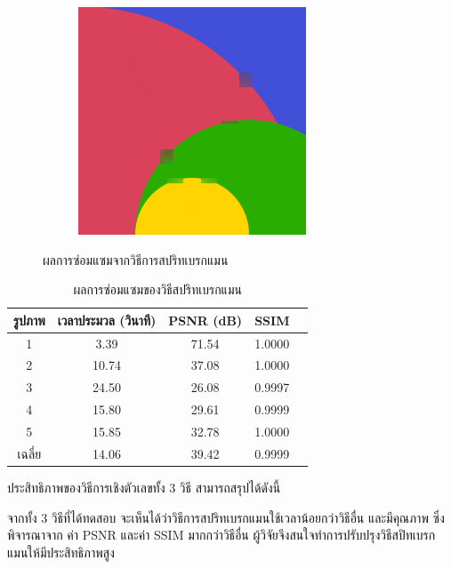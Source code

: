 \begin{figure}[H]
\begin{subfigure}{0.4\linewidth}
		\includegraphics[width=0.8\linewidth]{image/result_ex1/splitbergman05.png}			
	\end{subfigure}
	\caption{ผลการซ่อมแซมจากวิธีการสปริทเบรกแมน}
		\label{result:image-splitbregman}
\end{figure}
\begin{table}[H]
	\centering
	\begin{tabular}[ht]{|c|c|c|c|c|}
		\hline
		รูปภาพ &เวลาประมวล  (วินาที) & PSNR (dB) & SSIM \\
		\hline
		1 & 3.39 & 71.54 & 1.0000 \\ 
		2 & 10.74 & 37.08 & 1.0000 \\
		3 &  24.50 & 26.08 & 0.9997 \\
		4 & 15.80  & 29.61  & 0.9999 \\
		5 & 15.85  & 32.78  & 1.0000 \\
		\hline
		เฉลี่ย & 14.06  & 39.42  & 0.9999 \\
		\hline
	\end{tabular}
	\caption{ผลการซ่อมแซมของวิธีสปริทเบรกแมน}
	\label{result:table-splitbregman}
\end{table}
\hspace{1cm} ประสิทธิภาพของวิธีการเชิงตัวเลขทั้ง 3 วิธี สามารถสรุปได้ดังนี้

\hspace{1cm} 
จากทั้ง 3 วิธีที่ได้ทดสอบ จะเห็นได้ว่าวิธีการสปริทเบรกแมนใช้เวลาน้อยกว่าวิธีอื่น และมีคุณภาพ ซึ่งพิจารณาจาก ค่า PSNR และค่า SSIM มากกว่าวิธีอื่น ผู้วิจัยจึงสนใจทำการปรับปรุงวิธีสปิทเบรกแมนให้มีประสิทธิภาพสูง


